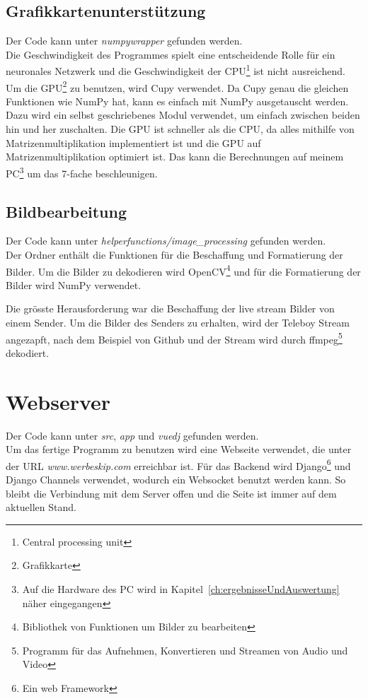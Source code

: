 \documentclass[12pt,a4paper]{report}
\begin{document}
\subsection{Grafikkartenunterstützung}
Der Code kann unter \textit{numpywrapper} gefunden werden.\bigskip\\
Die Geschwindigkeit des Programmes spielt eine entscheidende Rolle für ein
neuronales Netzwerk und die Geschwindigkeit der CPU\footnote{Central processing unit} ist nicht ausreichend.
Um die GPU\footnote{Grafikkarte} zu benutzen, wird Cupy verwendet.
Da Cupy genau die gleichen Funktionen wie NumPy hat, kann es einfach mit NumPy ausgetauscht werden.
Dazu wird ein selbst geschriebenes Modul verwendet, um einfach zwischen beiden hin und her zuschalten.
Die GPU ist schneller als die CPU, da alles mithilfe von Matrizenmultiplikation implementiert ist und
die GPU auf Matrizenmultiplikation optimiert ist.
Das kann die Berechnungen auf meinem
PC\footnote{Auf die Hardware des PC wird in Kapitel~\ref{ch:ergebnisseUndAuswertung} näher eingegangen} um das 7-fache beschleunigen.

\subsection{Bildbearbeitung}
Der Code kann unter \textit{helperfunctions/image\_processing} gefunden werden.\bigskip\\
Der Ordner enthält die Funktionen für die Beschaffung und Formatierung der Bilder.
Um die Bilder zu dekodieren wird OpenCV\cite{opencv_library}\footnote{Bibliothek von Funktionen um Bilder zu bearbeiten} und
für die Formatierung der Bilder wird NumPy verwendet.

Die grösste Herausforderung war die Beschaffung der live stream Bilder von einem Sender.
Um die Bilder des Senders zu erhalten, wird der Teleboy Stream angezapft, nach dem Beispiel von Github\cite{gittele} und
der Stream wird durch ffmpeg\footnote{Programm für das Aufnehmen, Konvertieren und Streamen von Audio und Video} dekodiert.

\section{Webserver}
Der Code kann unter \textit{src}, \textit{app} und \textit{vuedj} gefunden werden.\bigskip\\
Um das fertige Programm zu benutzen wird eine Webseite verwendet, die unter der URL \textit{www.werbeskip.com} erreichbar ist.
Für das Backend wird Django\cite{django}\footnote{Ein web Framework} und Django Channels\cite{django_channel} verwendet, wodurch ein Websocket benutzt werden kann.
So bleibt die Verbindung mit dem Server offen und die Seite ist immer auf dem aktuellen Stand.
\end{document}

